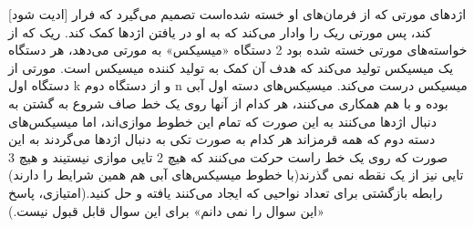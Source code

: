 [ادیت شود]
\p
    اژدهای مورتی که از فرمان‌های او خسته شده‌است تصمیم می‌گیرد که فرار کند، پس مورتی ریک را وادار می‌کند که به او در یافتن اژدها کمک کند. ریک که از خواسته‌های مورتی خسته شده بود 2 دستگاه «میسیکس» به مورتی می‌دهد، هر دستگاه یک میسیکس تولید می‌کند که هدف آن کمک به تولید کننده میسیکس است. مورتی از دستگاه اول k و از دستگاه دوم n میسیکس درست می‌کند. میسیکس‌های دسته اول آبی بوده و با هم همکاری می‌کنند، هر کدام از آنها روی یک خط صاف شروع به گشتن  به دنبال اژدها می‌کنند به این صورت که تمام این خطوط موازی‌اند، اما میسیکس‌های دسته دوم که همه قرمزاند هر کدام به صورت تکی به دنبال اژدها می‌گردند به این صورت که روی یک خط راست حرکت می‌کنند که هیچ 2 تایی موازی نیستیند و هیچ 3 تایی نیز از یک نقطه نمی گذرند(با خطوط میسیکس‌های آبی هم همین شرایط را دارند) رابطه بازگشتی برای تعداد نواحیی که ایجاد می‌کنند یافته و حل کنید.(امتیازی، پاسخ «این سوال را نمی دانم» برای این سوال قابل قبول نیست.)